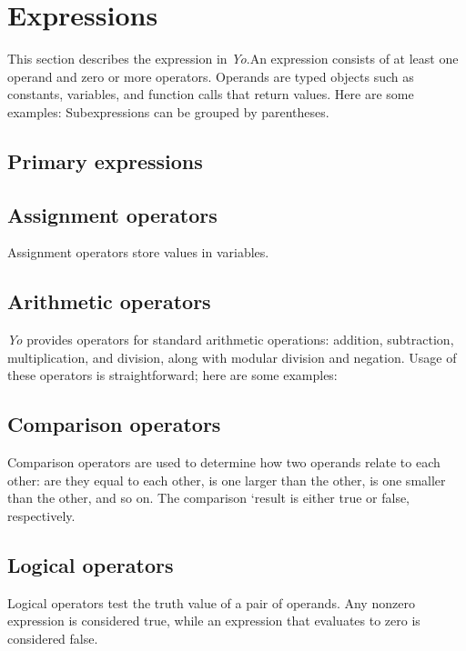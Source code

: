 \documentclass[12pt]{article}
\begin{document}



\section{Expressions} %
This section describes the expression in \textit{Yo}.An expression consists of at least one operand and zero or more operators. Operands are typed objects such as constants, variables, and function calls that return values. Here are some examples:
Subexpressions can be grouped by parentheses.
\subsection{Primary expressions} %

\subsection{Assignment operators} %
Assignment operators store values in variables.


\subsection{Arithmetic operators} %
\textit{Yo} provides operators for standard arithmetic operations: addition, subtraction, multiplication, and division, along with modular division and negation. Usage of these operators is straightforward; here are some examples:
\subsection{Comparison operators} %
Comparison operators are used to determine how two operands relate to each other: are they equal to each other, is one larger than the other, is one smaller than the other, and so on. The comparison `result is either true or false, respectively.

\subsection{Logical operators} %
Logical operators test the truth value of a pair of operands. Any nonzero expression is considered true, while an expression that evaluates to zero is considered false.
\end{document}
